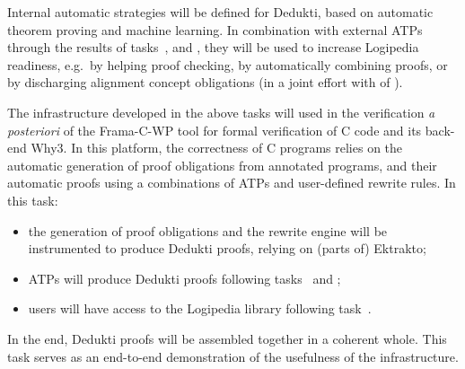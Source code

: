 \begin{workpackage}
\begin{tasklist}
  \begin{task}[id=readiness,
      title=ATPs to increase Logipedia readiness,
      lead=Inn,
      SacRM=4,
      InnRM=6,
      BelRM=3,
      wphases=1-48!.5
    ]

    Internal automatic strategies will be defined for Dedukti, based on
    automatic theorem proving and machine learning. In combination with
    external ATPs through the results of
    tasks~,
     and ,
    they will be used to increase Logipedia readiness, e.g.\ by helping
    proof checking, by automatically combining proofs, or by discharging
    alignment concept obligations (in a joint effort with
     of ).




\end{task}


\begin{task}[id=cooperation,
    title=Logipedia and ATP end-to-end,
    lead=Cea,
    CeaRM=18,
    wphases=13-48!.5
    ]

    The infrastructure developed in the above tasks will used in the verification {\em a
      posteriori} of the Frama-C-WP tool for formal verification of C
    code and its back-end Why3. In this platform, the correctness of C
    programs relies on the automatic generation of proof obligations
    from annotated programs, and their automatic proofs using a
    combinations of ATPs and user-defined rewrite rules. In this task:
    \begin{itemize}
    \item the generation of proof obligations and the rewrite engine
      will be instrumented to produce Dedukti proofs, relying on (parts
      of) Ektrakto;
    \item ATPs will produce Dedukti proofs following
      tasks~ and
      ;
    \item users will have access to the Logipedia library following
      task~.
    \end{itemize}
    In the end, Dedukti proofs will be assembled together in a coherent whole.
    This task serves as an end-to-end demonstration of the usefulness of the
    infrastructure.


\end{task}
\end{tasklist}
\end{workpackage}
